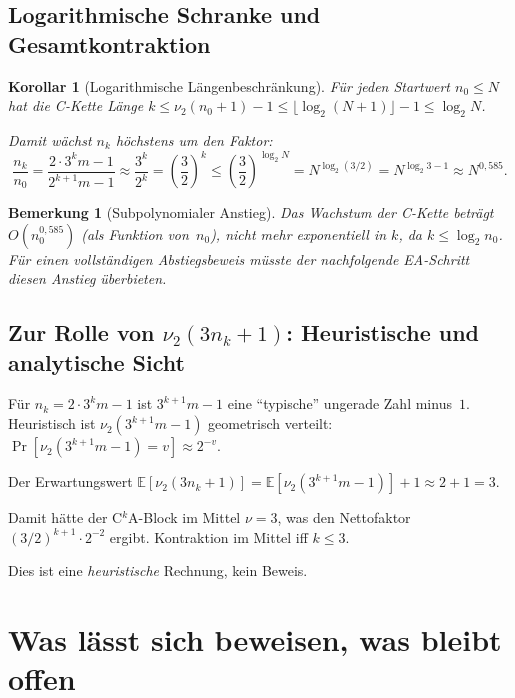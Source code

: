 \documentclass[12pt,a4paper]{article}
\newtheorem{korollar}[definition]{Korollar}
\newtheorem{bemerkung}[definition]{Bemerkung}
\newcommand{\vii}{\nu_2}
\begin{document}
\subsection{Logarithmische Schranke und Gesamtkontraktion}

\begin{korollar}[Logarithmische Längenbeschränkung]
\label{kor:log-laenge}
Für jeden Startwert $n_0 \leq N$ hat die C-Kette Länge
$k \leq \vii(n_0+1) - 1 \leq \lfloor\log_2(N+1)\rfloor - 1 \leq \log_2 N$.

Damit wächst $n_k$ höchstens um den Faktor:
\[
  \frac{n_k}{n_0}
  = \frac{2 \cdot 3^k m - 1}{2^{k+1}m - 1}
  \approx \frac{3^k}{2^k}
  = \left(\frac{3}{2}\right)^k
  \leq \left(\frac{3}{2}\right)^{\log_2 N}
  = N^{\log_2(3/2)}
  = N^{\log_2 3 - 1}
  \approx N^{0{,}585}.
\]
\end{korollar}

\begin{bemerkung}[Subpolynomialer Anstieg]
Das Wachstum der C-Kette beträgt $O(n_0^{0{,}585})$ (als Funktion von~$n_0$),
nicht mehr exponentiell in $k$, da $k \leq \log_2 n_0$.
Für einen vollständigen Abstiegsbeweis müsste der nachfolgende EA-Schritt
diesen Anstieg überbieten.
\end{bemerkung}

\subsection{Zur Rolle von $\nu_2(3n_k+1)$: Heuristische und analytische Sicht}

\begin{tcolorbox}[warnung, title={Heuristisches Argument}]
Für $n_k = 2 \cdot 3^k m - 1$ ist $3^{k+1}m - 1$ eine ``typische'' ungerade Zahl
minus~$1$. Heuristisch ist $\vii(3^{k+1}m-1)$ geometrisch verteilt:
$\Pr[\vii(3^{k+1}m-1) = v] \approx 2^{-v}$.

Der Erwartungswert $\mathbb{E}[\vii(3n_k+1)] = \mathbb{E}[\vii(3^{k+1}m-1)] + 1 \approx 2 + 1 = 3$.

Damit hätte der C$^k$A-Block im Mittel $\nu = 3$, was den Nettofaktor
$(3/2)^{k+1} \cdot 2^{-2}$ ergibt. Kontraktion im Mittel iff $k \leq 3$.

Dies ist eine \emph{heuristische} Rechnung, kein Beweis.
\end{tcolorbox}

\section{Was lässt sich beweisen, was bleibt offen}
\label{sec:fazit}
\end{document}
